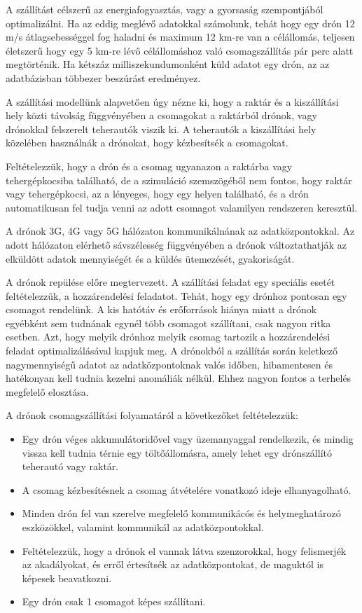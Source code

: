A szállítást célszerű az energiafogyasztás, vagy a gyorsaság szempontjából optimalizálni.
Ha az eddig meglévő adatokkal számolunk, tehát hogy egy drón 12 m/s átlagsebességgel fog haladni és maximum 12 km-re van a célállomás, teljesen életszerű hogy egy 5 km-re lévő célállomáshoz való csomagszállítás pár perc alatt megtörténik.
Ha kétszáz milliszekundumonként küld adatot egy drón, az az adatbázisban többezer beszúrást eredményez.


A szállítási modellünk alapvetően úgy nézne ki, hogy a raktár és a kiszállítási hely közti távolság függvényében a csomagokat a raktárból drónok, vagy drónokkal felszerelt teherautók viszik ki.
A teherautók a kiszállítási hely közelében használnák a drónokat, hogy kézbesítsék a csomagokat.

Feltételezzük, hogy a drón és a csomag ugyanazon a raktárba vagy tehergépkocsiba található, de a szimuláció szemszögéből nem fontos, hogy raktár vagy tehergépkocsi, az a lényeges, hogy egy helyen található, és a drón automatikusan fel tudja venni az adott csomagot valamilyen rendszeren keresztül.

A drónok 3G, 4G vagy 5G hálózaton kommunikálnának az adatközpontokkal.
Az adott hálózaton elérhető sávszélesség függvényében a drónok változtathatják az elküldött adatok mennyiségét és a küldés ütemezését, gyakoriságát.

A drónok repülése előre megtervezett. A szállítási feladat egy speciális esetét feltételezzük, a hozzárendelési feladatot.
Tehát, hogy egy drónhoz pontosan egy csomagot rendelünk. A kis hatótáv és erőforrások hiánya miatt a drónok egyébként sem tudnának egynél több csomagot szállítani, csak nagyon ritka esetben.
Azt, hogy melyik drónhoz melyik csomag tartozik a hozzárendelési feladat optimalizálásával kapjuk meg.
A drónokból a szállítás során keletkező nagymennyiségű adatot az adatközpontoknak valós időben, hibamentesen
és hatékonyan kell tudnia kezelni anomáliák nélkül.
Ehhez nagyon fontos a terhelés megfelelő elosztása.

A drónok csomagszállítási folyamatáról a következőket feltételezzük:
\begin{itemize}
    \item Egy drón  véges akkumulátoridővel vagy üzemanyaggal rendelkezik, és mindig vissza kell tudnia térnie egy töltőállomásra, amely lehet egy drónszállító teherautó vagy raktár.
    \item A csomag kézbesítésnek a csomag átvételére vonatkozó ideje elhanyagolható.
    \item Minden drón fel van szerelve megfelelő kommunikácós és helymeghatározó eszközökkel, valamint kommunikál az adatközpontokkal.
    \item Feltételezzük, hogy a drónok el vannak látva szenzorokkal, hogy felismerjék az akadályokat, és erről értesítsék az adatközpontokat, de maguktól is képesek beavatkozni.
    \item Egy drón csak 1 csomagot képes szállítani.
\end{itemize}

